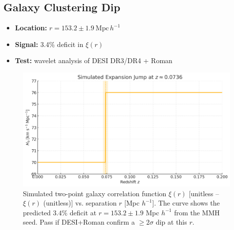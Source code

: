 \documentclass[11pt,a4paper]{article}
\begin{document}
\subsection{Galaxy Clustering Dip}
\begin{itemize}
  \item \textbf{Location:} $r = 153.2 \pm 1.9~\mathrm{Mpc}\,h^{-1}$
  \item \textbf{Signal:} 3.4\% deficit in $\xi(r)$
  \item \textbf{Test:} wavelet analysis of DESI DR3/DR4 + Roman
\end{itemize}
\FloatBarrier
\begin{figure}[htbp]
  \centering
  \includegraphics[width=0.75\linewidth]{figs/153mpc_dip.png}
  \caption{Simulated two-point galaxy correlation function $\xi(r)$ [unitless -- $\xi(r)$ (unitless)] vs. separation $r$ [Mpc $h^{-1}$]. The curve shows the predicted $3.4\%$ deficit at $r = 153.2 \pm 1.9$ Mpc $h^{-1}$ from the MMH seed. Pass if DESI+Roman confirm a $\geq 2\sigma$ dip at this $r$.}
  \label{fig:clustering_dip}
\end{figure}
\FloatBarrier
\end{document}
